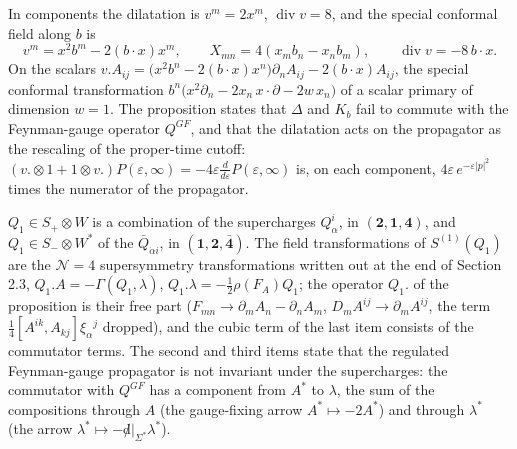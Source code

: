\begin{remark}
In components the dilatation is $v^m=2x^m$, $\operatorname{div}v=8$, and the special conformal field along $b$ is
\[
v^m=x^2b^m-2(b\cdot x)x^m,\qquad X_{mn}=4(x_mb_n-x_nb_m),\qquad \operatorname{div}v=-8\,b\cdot x .
\]
On the scalars $v.A_{ij}=\big(x^2b^n-2(b\cdot x)x^n\big)\partial_nA_{ij}-2(b\cdot x)A_{ij}$, the special conformal transformation $b^n\big(x^2\partial_n-2x_n\,x\cdot\partial-2w\,x_n\big)$ of a scalar primary of dimension $w=1$. The proposition states that $\Delta$ and $K_b$ fail to commute with the Feynman-gauge operator $Q^{GF}$, and that the dilatation acts on the propagator as the rescaling of the proper-time cutoff: $(v.\otimes1+1\otimes v.)P(\varepsilon,\infty)=-4\varepsilon\frac{d}{d\varepsilon}P(\varepsilon,\infty)$ is, on each component, $4\varepsilon\,e^{-\varepsilon|p|^2}$ times the numerator of the propagator.
\end{remark}

\begin{remark}
$Q_1\in S_+\otimes W$ is a combination of the supercharges $Q^i_\alpha$, in $(\mathbf2,\mathbf1,\mathbf4)$, and $Q_1\in S_-\otimes W^*$ of the $\bar Q_{\dot\alpha i}$, in $(\mathbf1,\mathbf2,\bar{\mathbf4})$. The field transformations of $S^{(1)}(Q_1)$ are the $\mathcal N=4$ supersymmetry transformations written out at the end of Section 2.3, $Q_1.A=-\Gamma(Q_1,\lambda)$, $Q_1.\lambda=-\tfrac12\rho(F_A)Q_1$; the operator $Q_1.$ of the proposition is their free part ($F_{mn}\to\partial_mA_n-\partial_nA_m$, $D_mA^{ij}\to\partial_mA^{ij}$, the term $\tfrac14[A^{ik},A_{kj}]\xi_\alpha{}^j$ dropped), and the cubic term of the last item consists of the commutator terms. The second and third items state that the regulated Feynman-gauge propagator is not invariant under the supercharges: the commutator with $Q^{GF}$ has a component from $A^*$ to $\lambda$, the sum of the compositions through $A$ (the gauge-fixing arrow $A^*\mapsto-2A^*$) and through $\lambda^*$ (the arrow $\lambda^*\mapsto-{\not d}|_{\Sigma^*}\lambda^*$).
\end{remark}

